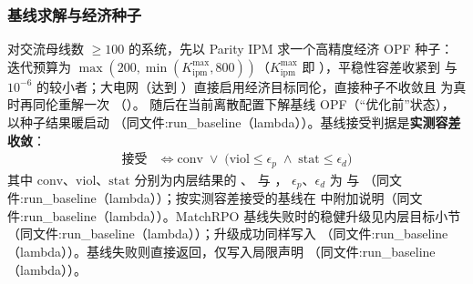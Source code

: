 \subsubsection*{基线求解与经济种子}
对交流母线数 $\ge 100$ 的系统，先以 Parity IPM 求一个高精度经济 OPF 种子：
迭代预算为 $\max(200,\min(K_{\mathrm{ipm}}^{\max},800))$（$K_{\mathrm{ipm}}^{\max}$
即 ），平稳性容差收紧到  与
$10^{-6}$ 的较小者；大电网（达到
）直接启用经济目标同伦，直接种子不收敛且
 为真时再同伦重解一次
（）。
随后在当前离散配置下解基线 OPF（“优化前”状态），以种子结果暖启动
（同文件:run\_baseline（lambda））。基线接受判据是\textbf{实测容差收敛}：
\begin{align*}
\text{接受} &\iff \mathrm{conv}\;\lor\;
  \bigl(\mathrm{viol}\le\epsilon_p\;\land\;\mathrm{stat}\le\epsilon_d\bigr)
\end{align*}
其中 $\mathrm{conv}$、$\mathrm{viol}$、$\mathrm{stat}$ 分别为内层结果的
、 与 ，
$\epsilon_p$、$\epsilon_d$ 为  与
（同文件:run\_baseline（lambda））；按实测容差接受的基线在
 中附加说明（同文件:run\_baseline（lambda））。MatchRPO 基线失败时的稳健升级见内层目标小节
（同文件:run\_baseline（lambda））；升级成功同样写入 
（同文件:run\_baseline（lambda））。基线失败则直接返回，仅写入局限声明
（同文件:run\_baseline（lambda））。

